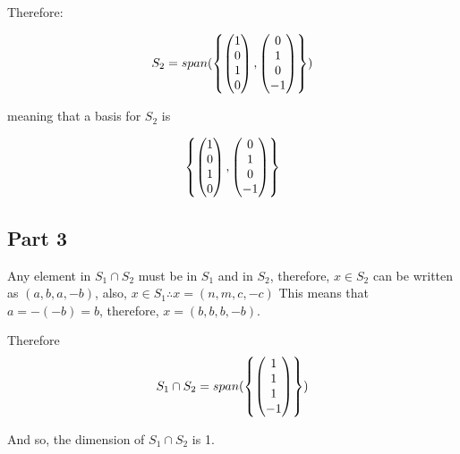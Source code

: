 \documentclass[12pt]{article} %
\begin{document}
\begin{homeworkProblem}
    Therefore:

    $$
        S_2 = span(\left\{
            \begin{pmatrix} 1 \\ 0 \\ 1 \\ 0 \end{pmatrix},
            \begin{pmatrix} 0 \\ 1 \\ 0 \\ -1 \end{pmatrix}
        \right\})
    $$

    meaning that a basis for $S_2$ is

    $$
        \left\{
            \begin{pmatrix} 1 \\ 0 \\ 1 \\ 0 \end{pmatrix},
            \begin{pmatrix} 0 \\ 1 \\ 0 \\ -1 \end{pmatrix}
        \right\}
    $$

    \subsection*{Part 3}

    Any element in $S_1 \cap S_2$ must be in $S_1$ and in $S_2$, therefore, $x \in S_2$ can be written as $(a, b, a, -b)$, also, $x \in S_1 \therefore x = (n, m, c, -c)$
    This means that $a = -(-b) = b$, therefore, $x = (b, b, b, -b)$.

    Therefore
    $$
        S_1 \cap S_2 = span(\left\{
            \begin{pmatrix} 1 \\ 1 \\ 1 \\ -1 \end{pmatrix}
        \right\})
    $$

    And so, the dimension of $S_1 \cap S_2$ is 1.
\end{homeworkProblem}
\pagebreak
\end{document}
